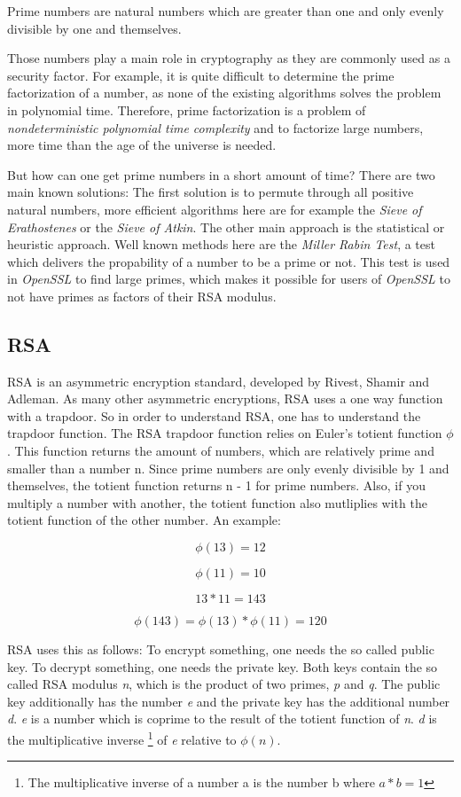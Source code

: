 Prime numbers are natural numbers which are greater than one and only evenly
divisible by one and themselves.

Those numbers play a main role in cryptography as they are commonly used
as a security factor. For example, it is quite difficult to determine the
prime factorization of a number, as none of the existing algorithms solves
the problem in polynomial time. Therefore, prime factorization is a problem
of \textit{nondeterministic polynomial time complexity} and to factorize
large numbers, more time than the age of the universe is needed.

But how can one get prime numbers in a short amount of time? There are two
main known solutions: The first solution is to permute through all positive
natural numbers, more efficient algorithms here are for example the
\textit{Sieve of Erathostenes} or the \textit{Sieve of Atkin}. The other
main approach is the statistical or heuristic approach. Well known methods
here are the \textit{Miller Rabin Test}, a test which delivers the propability
of a number to be a prime or not. This test is used in \textit{OpenSSL} to
find large primes, which makes it possible for users of \textit{OpenSSL} to
not have primes as factors of their RSA modulus.

\subsection{RSA}
	
RSA is an asymmetric encryption standard, developed by Rivest, Shamir and
Adleman. As many other asymmetric encryptions, RSA uses a one way function
with a trapdoor. So in order to understand RSA, one has to understand the
trapdoor function. The RSA trapdoor function relies on Euler's totient function
$\phi$. This function returns the amount of numbers, which are relatively prime
and smaller than a number n. Since prime numbers are only evenly divisible by
1 and themselves, the totient function returns n - 1 for prime numbers. Also,
if you multiply a number with another, the totient function also mutliplies
with the totient function of the other number. An example:

$$\phi(13) = 12$$

$$\phi(11) = 10$$

$$13 * 11 = 143$$

$$\phi(143) = \phi(13) * \phi(11) = 120$$

RSA uses this as follows: To encrypt something, one needs the so called
public key. To decrypt something, one needs the private key. Both keys
contain the so called RSA modulus \textit{n}, which is the product of 
two primes, \textit{p} and \textit{q}. The public key additionally has
the number \textit{e} and the private key has the additional number
\textit{d}. \textit{e} is a number which is coprime to the result of
the totient function of \textit{n}. \textit{d} is the multiplicative inverse
\footnote{The multiplicative inverse of a number a is the number b where $a*b = 1$} of
\textit{e} relative to $\phi(n)$.

